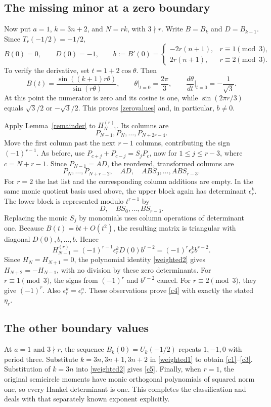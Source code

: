 \documentclass[10pt]{article}
\begin{document}
\subsection*{The missing minor at a zero boundary}
Now put $a=1$, $k=3n+2$, and $N=rk$, with $3\nmid r$.
Write $B=B_k$ and $D=B_{k-1}$. Since $T_r(-1/2)=-1/2$,
\begin{equation}\label{zerovalues}
 B(0)=0,\qquad D(0)=-1,\qquad
 b:=B'(0)=\begin{cases}-2r(n+1),&r\equiv1\pmod3,\\
                         2r(n+1),&r\equiv2\pmod3.\end{cases}
\end{equation}
To verify the derivative, set $t=1+2\cos\theta$. Then
\[
 B(t)=\frac{\sin((k+1)r\theta)}{\sin(r\theta)},\qquad
 \theta\big|_{t=0}=\frac{2\pi}{3},\qquad
 \frac{d\theta}{dt}\bigg|_{t=0}=-\frac1{\sqrt3}.
\]
At this point the numerator is zero and its cosine is one, while
$\sin(2\pi r/3)$ equals $\sqrt3/2$ or $-\sqrt3/2$.
This proves \eqref{zerovalues} and, in particular, $b\ne0$.

Apply Lemma~\ref{remainder} to $H_{N-1}^{(r)}$. Its columns are
\[
 P_{N-1},P_N,\ldots,P_{N+2r-4}.
\]
Move the first column past the next $r-1$ columns, contributing the
sign $(-1)^{r-1}$. As before, use
$P_{c+j}+P_{c-j}=S_jP_c$, now for $1\le j\le r-3$, where
$c=N+r-1$. Since $P_{N-1}=A D$, the reordered, transformed columns are
\[
 P_N,\ldots,P_{N+r-2},\quad A D,\quad
 A B S_0,\ldots,A B S_{r-3}.
\]
For $r=2$ the last list and the corresponding column additions are
empty. In the same monic quotient basis used above, the upper block
again has determinant $\epsilon_r^k$. The lower block is represented
modulo $t^{r-1}$ by
\[
 D,\quad B S_0,\ldots,B S_{r-3}.
\]
Replacing the monic $S_j$ by monomials uses column operations of
determinant one. Because $B(t)=bt+O(t^2)$, the resulting matrix is
triangular with diagonal $D(0),b,\ldots,b$. Hence
\begin{equation}\label{minor}
 H_{N-1}^{(r)}=(-1)^{r-1}\epsilon_r^k D(0)b^{r-2}
              =(-1)^r\epsilon_r^k b^{r-2}.
\end{equation}
Since $H_N=H_{N+1}=0$, the polynomial identity
\eqref{weighted2} gives $H_{N+2}=-H_{N-1}$, with no division by
these zero determinants. For $r\equiv1\pmod3$, the signs from
$(-1)^r$ and $b^{r-2}$ cancel. For $r\equiv2\pmod3$, they give
$(-1)^r$. Also $\epsilon_r^k=\epsilon_r^n$. These observations prove
\eqref{c4} with exactly the stated $\eta_r$.

\subsection*{The other boundary values}
At $a=1$ and $3\nmid r$, the sequence $B_k(0)=U_k(-1/2)$ repeats
$1,-1,0$ with period three. Substitute $k=3n,3n+1,3n+2$ in
\eqref{weighted1} to obtain \eqref{c1}--\eqref{c3}.
Substitution of $k=3n$ into \eqref{weighted2} gives \eqref{c5}.
Finally, when $r=1$, the original semicircle moments have monic
orthogonal polynomials of squared norm one, so every Hankel
determinant is one. This completes the classification and deals
with that separately known exponent explicitly.
\end{document}
